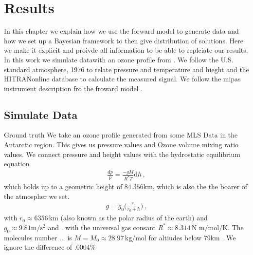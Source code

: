 \chapter{Results}
\label{ch:res}

In this chapter we explain how we use the forward model to generate data and how we set up a Bayesian framework to then give distribution of solutions.
Here we make it explicit and proivde all information to be able to replciate our results.
In this work we simulate datawith an ozone profile from \cite{}.
We follow the U.S. standard atmosphere, 1976 \cite{} to relate pressure and temperature and hieght and the HITRANonline \cite{} database to calculate the measured signal.\expandafter\string\the\font 
We follow the mipas instrument description fro the froward model \cite{}.

\section{Simulate Data}
Ground truth
We take an ozone profile generated from some MLS Data \cite{MLSdata} in the Antarctic region.
This gives us pressure values and Ozone volume mixing ratio values.
We connect pressure and height values with the hydrostatic equilibrium equation
\begin{align}
	\frac{\text{d}p}{p} = \frac{- g M}{R^* T} \text{d} h \, ,
\end{align}
which holds up to a geometric height of $84.356$km, which is also the the boarer of the atmospher we set.
\begin{align}
	g = g_0 \Bigg( \frac{r_0}{r_0 + h} \Bigg) \, ,
\end{align}
with $r_0 \approx 6356 \, \text{km}$ (also known as the polar radius of the earth) and $g_0 \approx 9.81 \text{m}/\text{s}^2$ and \cite{}.
with the universal gas consant $R^* \approx 8.314  \, \text{N m} / \text{mol} / \text{K}$. The molecules number ... is $M = M_0 \approx 28.97 \, \text{kg}/\text{mol}$ for altiudes below 79km \cite{}.
We ignore the difference of $.0004\%$

